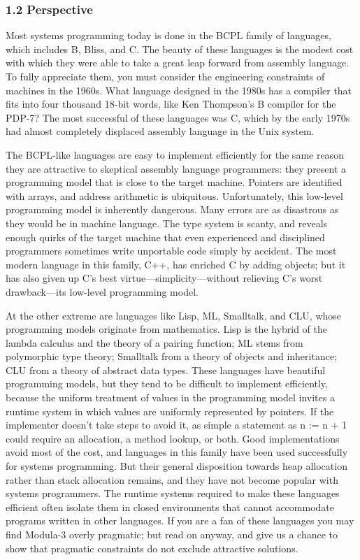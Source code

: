 \documentclass[10pt]{article}
\begin{document}
 
\subsubsection*{1.2 Perspective}


  Most systems programming today is done in the BCPL family of languages, which includes B, Bliss, and C. The beauty of these languages is the modest cost with which they were able to take a great leap forward from assembly language. To fully appreciate them, you must consider the engineering constraints of machines in the 1960s. What language designed in the 1980s has a compiler that fits into four thousand 18-bit words, like Ken Thompson's B compiler for the PDP-7? The most successful of these languages was C, which by the early 1970s had almost completely displaced assembly language in the Unix system. 


 The BCPL-like languages are easy to implement efficiently for the same reason they are attractive to skeptical assembly language programmers: they present a programming model that is close to the target machine. Pointers are identified with arrays, and address arithmetic is ubiquitous. Unfortunately, this low-level programming model is inherently dangerous. Many errors are as disastrous as they would be in machine language. The type system is scanty, and reveals enough quirks of the target machine that even experienced and disciplined programmers sometimes write unportable code simply by accident. The most modern language in this family, C++, has enriched C by adding objects; but it has also given up C's best virtue---simplicity---without relieving C's worst drawback---its low-level programming model. 


 At the other extreme are languages like Lisp, ML, Smalltalk, and CLU, whose programming models originate from mathematics. Lisp is the hybrid of the lambda calculus and the theory of a pairing function; ML stems from polymorphic type theory; Smalltalk from a theory of objects and inheritance; CLU from a theory of abstract data types. These languages have beautiful programming models, but they tend to be difficult to implement efficiently, because the uniform treatment of values in the programming model invites a runtime system in which values are uniformly represented by pointers. If the implementer doesn't take steps to avoid it, as simple a statement as n := n + 1 could require an allocation, a method lookup, or both. Good implementations avoid most of the cost, and languages in this family have been used successfully for systems programming. But their general disposition towards heap allocation rather than stack allocation remains, and they have not become popular with systems programmers. The runtime systems required to make these languages efficient often isolate them in closed environments that cannot accommodate programs written in other languages. If you are a fan of these languages you may find Modula-3 overly pragmatic; but read on anyway, and give us a chance to show that pragmatic constraints do not exclude attractive solutions. 
\end{document}
